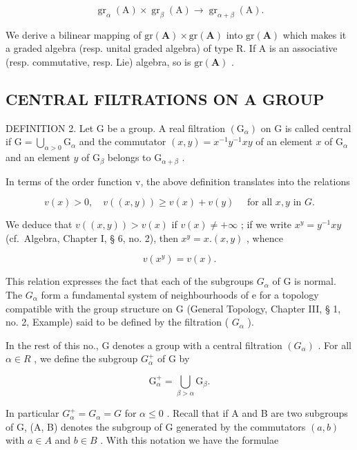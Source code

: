 \[
\operatorname{gr} _ {\alpha} (\mathrm{A}) \times \operatorname{gr} _ {\beta} (\mathrm{A}) \rightarrow \operatorname{gr} _ {\alpha + \beta} (\mathrm{A}).
\]

We derive a bilinear mapping of \(\mathrm{gr}(\mathbf{A}) \times \mathrm{gr}(\mathbf{A})\) into \(\mathrm{gr}(\mathbf{A})\) which makes it a graded algebra (resp. unital graded algebra) of type R. If A is an associative (resp. commutative, resp. Lie) algebra, so is \(\mathrm{gr}(\mathbf{A})\) .

\subsection{CENTRAL FILTRATIONS ON A GROUP}

DEFINITION 2. Let G be a group. A real filtration \((\mathrm{G}_{\alpha})\) on G is called central if \(\mathrm{G} = \bigcup_{\alpha >0}\mathrm{G}_{\alpha}\) and the commutator \((x,y) = x^{-1}y^{-1}xy\) of an element \(x\) of \(\mathrm{G}_{\alpha}\) and an element \(y\) of \(\mathrm{G}_{\beta}\) belongs to \(\mathrm{G}_{\alpha +\beta}\) .

In terms of the order function v, the above definition translates into the relations

\[
v (x) > 0, \quad v ((x, y)) \geqslant v (x) + v (y) \quad \text { for   all } x, y \text { in } G.\tag{10}
\]

We deduce that \(v((x,y)) > v(x)\) if \(v(x) \neq +\infty\) ; if we write \(x^y = y^{-1}xy\) (cf.~Algebra, Chapter I, § 6, no. 2), then \(x^y = x.(x,y)\) , whence

\[
v (x ^ {y}) = v (x).\tag{11}
\]

This relation expresses the fact that each of the subgroups \(G_{\alpha}\) of G is normal. The \(G_{\alpha}\) form a fundamental system of neighbourhoods of e for a topology compatible with the group structure on G (General Topology, Chapter III, § 1, no. 2, Example) said to be defined by the filtration ( \(G_{\alpha}\) ).

In the rest of this no., G denotes a group with a central filtration \((G_{\alpha})\) . For all \(\alpha \in R\) , we define the subgroup \(G_{\alpha}^{+}\) of G by

\[
\mathrm{G} _ {\alpha} ^ {+} = \bigcup_ {\beta > \alpha} \mathrm{G} _ {\beta}.\tag{12}
\]

In particular \(G_{\alpha}^{+} = G_{\alpha} = G\) for \(\alpha \leqslant 0\) . Recall that if A and B are two subgroups of G, (A, B) denotes the subgroup of G generated by the commutators \((a, b)\) with \(a \in A\) and \(b \in B\) . With this notation we have the formulae

